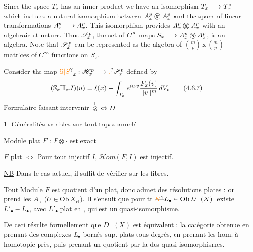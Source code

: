 Since the space $T_x$ has an inner product we have an isomorphism $T_x\longrightarrow T_x^*$ which induces a natural isomorphism between $A_x^p\mathbin{\ooalign{\hfil$\mathrm{x}$\hfil\cr\hfil$\handwritten{\bigcirc}$\hfil\cr}}A_x^p$ and the space of linear transformations $A_x^p\longrightarrow A_x^p$. This isomorphism provides $A_x^p\mathbin{\ooalign{\hfil$\mathrm{x}$\hfil\cr\hfil$\handwritten{\bigcirc}$\hfil\cr}}A_x^p$ with an algebraic structure. Thus $\mathscr S_x^p$, the set of $C^\infty$ maps $S_x\handwritten{\longrightarrow}A_x^p\mathbin{\ooalign{\hfil$\mathrm{x}$\hfil\cr\hfil$\handwritten{\bigcirc}$\hfil\cr}}A_x^p$, is an algebra. Note that $\mathscr S_x^p$ can be represented as the algebra of $\binom mp\,\mathrm{x}\,\binom mp$ matrices of $C^\infty$ functions on $S_x$.

Consider the map $\unsure{\mathbb S|S}_x:\handwritten{\mathscr H}_x^p\handwritten{\longrightarrow}\unsure{.}\handwritten{\mathscr S}_x^p$ defined by
\[
(\mathbb S_x\mathbb H_x J)(u)=\xi(x)+\int_{T_x} e^{iu\cdot v}\frac{F_x(v)}{\lVert v\rVert^m}\,dV_v
\tag*{(4.6.7)}
\]
Formulaire faisant intervenir $\overset{\mathbb L}{\otimes}$ et $D^-$

\textcircled{1} Généralités valables sur tout topos annelé

Module \uline{plat} $F$ : $F\otimes\cdot$ est exact.

$F$ plat $\Longleftrightarrow$ Pour tout injectif $I$, $\mathscr Hom(F,I)$ est injectif.

\uline{NB} Dans le cas actuel, il suffit de vérifier sur les fibres.

Tout Module $F$  est quotient d'un plat, donc admet des résolutions plates : on prend les $A_U$ ($U\in\mathrm{Ob}\,X_{\mathrm{ét}}$). Il s'ensuit  que pour tt $\deleted{\unsure{K}}L_{\bullet}\in\mathrm{Ob}\,D^-(X)$, existe  $L'_{\bullet}\mathbin{-}L_{\bullet}$, avec $L'_{\bullet}$ plat en , qui est un quasi-isomorphisme.

De ceci résulte formellement que $D^-(X)$ est équivalent : la catégorie obtenue en prenant  des complexes $L_{\bullet}$ bornés sup. plats  tous degrés,  en prenant les hom. à homotopie près, puis prenant un quotient par la   des quasi-isomorphismes.

